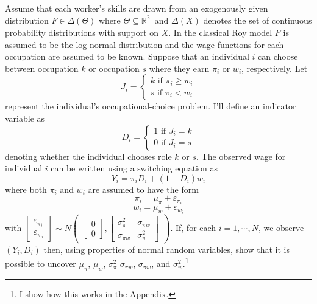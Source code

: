 \documentclass[12 pt]{article}
\begin{document}
Assume that each worker's skills are drawn from an exogenously given distribution $F\in \Delta(\Theta)$ where $\Theta \subseteq \mathbb{R}_+^2$ and $\Delta(X)$ denotes the set of continuous probability distributions with support on $X$. In the classical Roy model $F$ is assumed to be the log-normal distribution and the wage functions for each occupation are assumed to be known. Suppose that an individual $i$ can choose between occupation $k$ or occupation $s$ where they earn $\pi_i$ or $w_i$, respectively. Let 
\begin{equation}
	J_i =
	\begin{cases}
		k \text{ if } \pi_i \geq w_i\\
		s \text{ if } \pi_i < w_i
	\end{cases}
	\label{eqn:occ_choice}
\end{equation}
represent the individual's occupational-choice problem. I'll define an indicator variable as 
\begin{equation*}
	D_i =
	\begin{cases}
		1 \text{ if } J_i=k\\
		0 \text{ if } J_i=s
	\end{cases}
\end{equation*}
denoting whether the individual chooses role $k$ or $s$. The observed wage for individual $i$ can be written using a switching equation as
\begin{equation*}
	Y_i = \pi_i D_i + (1-D_i) w_i
\end{equation*}
where both $\pi_i$ and $w_i$ are assumed to have the form
\begin{equation}
	\pi_i = \mu_\pi + \varepsilon_{\pi_i}
	\label{eqn:pi_simple}
\end{equation}
\begin{equation}
	w_i = \mu_w + \varepsilon_{w_i}
	\label{eqn:w_simple}
\end{equation}
with $\begin{bmatrix}
	\varepsilon_{\pi_i}\\
	 \varepsilon_{w_i}
\end{bmatrix} \sim N \begin{pmatrix}
\begin{bmatrix}
0\\
0
\end{bmatrix},
\begin{bmatrix}
	\sigma_\pi^2 & \sigma_{\pi w}\\
	\sigma_{\pi w} & \sigma_w^2 
\end{bmatrix}
\end{pmatrix}$. If, for each $i=1,\cdots, N$, we observe $(Y_i,D_i)$ then, using properties of normal random variables, \citet{heckman1990empirical} show that it is possible to uncover $\mu_\pi$, $\mu_w$, $\sigma_\pi^2$ $\sigma_{\pi w}$, $\sigma_{\pi w}$, and $\sigma_w^2$.\footnote{I show how this works in the Appendix.}
\end{document}
